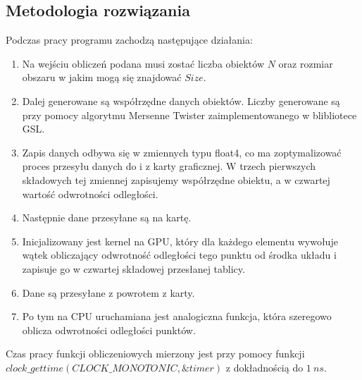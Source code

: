 \documentclass[paper=a4, fontsize=11pt]{scrartcl} %
\numberwithin{equation}{section} %
\numberwithin{figure}{section} %
\numberwithin{table}{section} %
\begin{document}
\subsection{Metodologia rozwiązania}
Podczas pracy programu zachodzą następujące działania:
\begin{enumerate}
\item Na wejściu obliczeń podana musi zostać liczba obiektów $N$ oraz rozmiar obszaru w jakim mogą się znajdować $Size$.
\item Dalej generowane są współrzędne danych obiektów. Liczby generowane są przy pomocy algorytmu Mersenne Twister zaimplementowanego w blibliotece GSL.
\item Zapis danych odbywa się w zmiennych typu float4, co ma zoptymalizować proces przesyłu danych do i z karty graficznej. W trzech pierwszych składowych tej zmiennej zapisujemy współrzędne obiektu, a w czwartej wartość odwrotności odległości.
\item Następnie dane przesyłane są na kartę.
\item Inicjalizowany jest kernel na GPU, który dla każdego elementu wywołuje wątek obliczający odwrotność odległości tego punktu od środka układu i zapisuje go w czwartej składowej przesłanej tablicy.
\item Dane są przesyłane z powrotem z karty.
\item Po tym na CPU uruchamiana jest analogiczna funkcja, która szeregowo oblicza odwrotności odległości punktów.
\end{enumerate}
Czas pracy funkcji obliczeniowych mierzony jest przy pomocy funkcji $clock\_gettime(CLOCK\_MONOTONIC,\&timer)$ z dokładnością do $1\: ns$.
\end{document}
